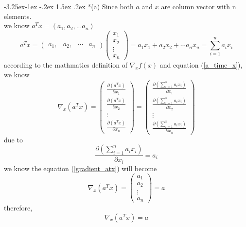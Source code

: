 \documentclass[12pt]{article}
\makeatletter
\renewcommand\subsection{\@startsection{subsection}{2}{\z@}%
	{-3.25ex\@plus -1ex \@minus -.2ex}%
	{1.5ex \@plus .2ex}%
	{\normalfont\large\bfseries}}%
\makeatother
\begin{document}
\subsection*{(a)}
Since both $a$ and $x$ are column vector with n elements.\\
we know $a^{T}x = (a_1, a_2, ... a_n)$
\begin{equation}\label{a_time_x}
	a^{T}x=  
		\left(  
		\begin{array}{cccc}  
			a_{1}, &  
			a_{2}, &   
			\cdots &  
			a_{n}  
		\end{array}  
		\right)  
		\left(  
		\begin{array}{c}  
			x_{1} \\   
			x_{2} \\  
			\vdots \\  
			x_{n}  
		\end{array}  
		\right)
		=a_1x_1+a_2x_2+\cdots a_nx_n
		= \sum_{i=1}^n a_i x_i
\end{equation}
according to the mathmatics definition of $\nabla_xf(x)$ and equation (\ref{a_time_x}), we know
\begin{equation}\label{gradient_atx}
	\nabla_x(a^Tx)=
		\left(  
		\begin{array}{c}  
			\frac{\partial(a^Tx)}{\partial x_1} \\
			\frac{\partial(a^Tx)}{\partial x_2} \\
			\vdots \\
			\frac{\partial(a^Tx)}{\partial x_n} 
		\end{array}
		\right)
		=
		\left(  
		\begin{array}{c}  
			\frac{\partial(\sum_{i=1}^n a_i x_i)}{\partial x_1} \\
			\frac{\partial(\sum_{i=1}^n a_i x_i)}{\partial x_2} \\
			\vdots \\
			\frac{\partial(\sum_{i=1}^n a_i x_i)}{\partial x_n} 
		\end{array}
		\right)
\end{equation}
due to
\begin{equation}\label{gradient_atx_i}
	\frac{\partial(\sum_{i=1}^n a_i x_i)}{\partial x_i}=a_i
\end{equation}
we know the equation (\ref{gradient_atx}) will become
\begin{equation}\label{gradient_atx_final}
	\nabla_x(a^Tx)=
	\left(  
		\begin{array}{c}  
			a_1 \\
			a_2 \\
			\vdots \\
			a_n 
		\end{array}
	\right)
	= a
\end{equation}
therefore, $$\nabla_x(a^Tx)=a$$
\end{document}
